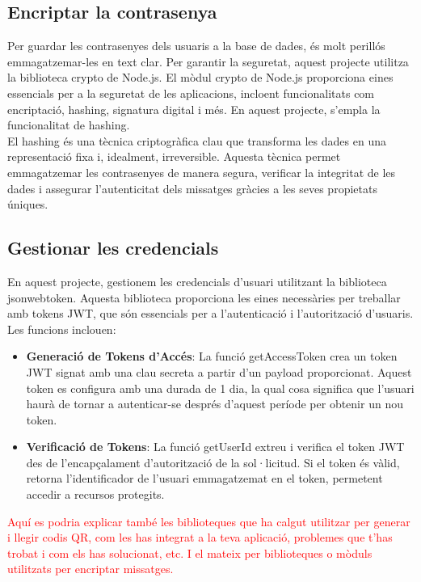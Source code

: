 \documentclass[a4paper,12pt,twoside]{ThesisStyle}
\newcommand{\pau}[1]{\textcolor{red}{#1}}
\begin{document}
\subsection{Encriptar la contrasenya}
\label{subsec: Encriptar la contrasenya}

Per guardar les contrasenyes dels usuaris a la base de dades, és molt perillós emmagatzemar-les en text clar. Per garantir la seguretat, aquest projecte utilitza la biblioteca crypto de Node.js. El mòdul crypto de Node.js proporciona eines essencials per a la seguretat de les aplicacions, incloent funcionalitats com encriptació, hashing, signatura digital i més. En aquest projecte, s'empla la funcionalitat de hashing.\\

El hashing és una tècnica criptogràfica clau que transforma les dades en una representació fixa i, idealment, irreversible. Aquesta tècnica permet emmagatzemar les contrasenyes de manera segura, verificar la integritat de les dades i assegurar l'autenticitat dels missatges gràcies a les seves propietats úniques.


\subsection{Gestionar les credencials}
\label{subsec: Gestionar les credencials}


En aquest projecte, gestionem les credencials d'usuari utilitzant la biblioteca jsonwebtoken. Aquesta biblioteca proporciona les eines necessàries per treballar amb tokens JWT, que són essencials per a l'autenticació i l'autorització d'usuaris. Les funcions inclouen:

\begin{itemize}
    \item \textbf{Generació de Tokens d'Accés}: La funció getAccessToken crea un token JWT signat amb una clau secreta a partir d'un payload proporcionat. Aquest token es configura amb una durada de 1 dia, la qual cosa significa que l'usuari haurà de tornar a autenticar-se després d'aquest període per obtenir un nou token.
    \item \textbf{Verificació de Tokens}: La funció getUserId extreu i verifica el token JWT des de l'encapçalament d'autorització de la sol·licitud. Si el token és vàlid, retorna l'identificador de l'usuari emmagatzemat en el token, permetent accedir a recursos protegits.
\end{itemize}


\pau{Aquí es podria explicar també les biblioteques que ha calgut utilitzar per generar i llegir codis QR, com les has integrat a la teva aplicació, problemes que t'has trobat i com els has solucionat, etc. I el mateix per biblioteques o mòduls utilitzats per encriptar missatges.}
\end{document}
